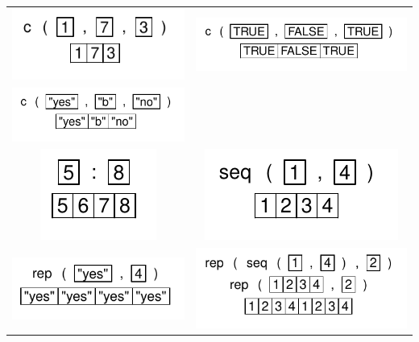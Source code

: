 \documentclass[pdflatex]{article}
\begin{document}
\begin{tabular}{cc}
\includegraphics{c_1} & \includegraphics{c_2}\\
\includegraphics{c_3} & \\
\includegraphics{operator_sequence} & \includegraphics{seq}\\
\includegraphics{rep} & \includegraphics{rep_seq}\\
\end{tabular}
\end{document}
